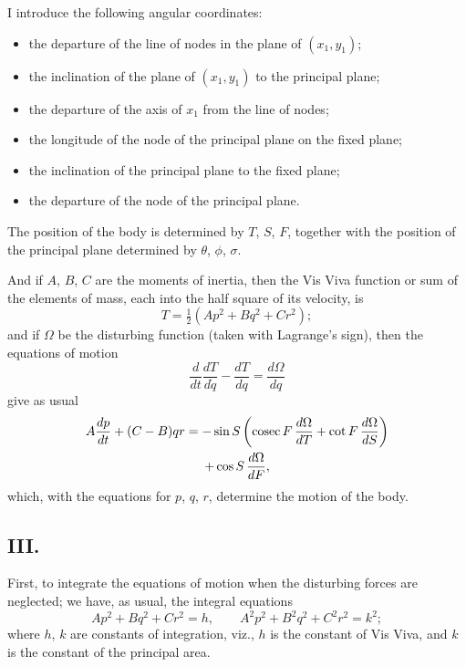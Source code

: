 \documentclass[11pt,a4paper]{article}
\DeclareMathOperator{\cosec}{cosec}
\begin{document}
I introduce the following angular coordinates:
\begin{itemize}
\item[$T$,] the departure of the line of nodes in the plane of $(x_1, y_1)$;
\item[$S$,] the inclination of the plane of $(x_1, y_1)$ to the principal plane;
\item[$F$,] the departure of the axis of $x_1$ from the line of nodes;
\item[$\theta$,] the longitude of the node of the principal plane on the fixed plane;
\item[$\phi$,] the inclination of the principal plane to the fixed plane;
\item[$\sigma$,] the departure of the node of the principal plane.
\end{itemize}

The position of the body is determined by $T$, $S$, $F$, together with the position of the principal plane determined by $\theta$, $\phi$, $\sigma$.

And if $A$, $B$, $C$ are the moments of inertia, then the Vis Viva function or sum of the elements of mass, each into the half square of its velocity, is
\[
T = \tfrac{1}{2}(Ap^2 + Bq^2 + Cr^2);
\]
and if $\Omega$ be the disturbing function (taken with Lagrange's sign), then the equations of motion
\[
\frac{d}{dt}\frac{dT}{d\dot{q}} - \frac{dT}{dq} = \frac{d\Omega}{dq}
\]
give as usual
\begin{multline}
A\frac{dp}{dt} + (C-B)qr = -\sin S\left(\cosec F\,\frac{d\Omega}{dT} + \cot F\,\frac{d\Omega}{dS}\right) \notag\\
+ \cos S\,\frac{d\Omega}{dF},
\end{multline}
which, with the equations for $p$, $q$, $r$, determine the motion of the body.

\subsection*{III.}

First, to integrate the equations of motion when the disturbing forces are neglected; we have, as usual, the integral equations
\[
Ap^2 + Bq^2 + Cr^2 = h, \qquad A^2p^2 + B^2q^2 + C^2r^2 = k^2;
\]
where $h$, $k$ are constants of integration, viz., $h$ is the constant of Vis Viva, and $k$ is the constant of the principal area.
\end{document}
